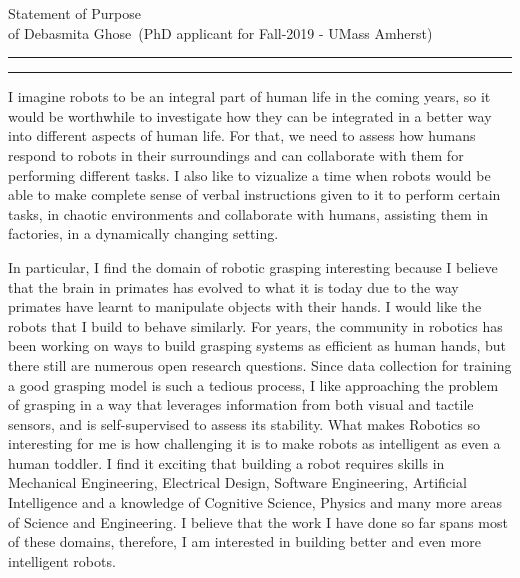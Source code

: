 \documentclass[11pt]{article}
\newcommand{\soptitle}{Statement of Purpose}
\newcommand{\yourname}{Debasmita Ghose}
\begin{document}
\begin{center}\LARGE\soptitle\\
\large of \yourname\ (PhD applicant for Fall-2019 - UMass Amherst)
\end{center}

\hrule
\vspace{0pt}
\hrule height 1pt

\justify

I imagine robots to be an integral part of human life in the coming years, so it would be worthwhile to investigate how they can be integrated in a better way into different aspects of human life. For that, we need to assess how humans respond to robots in their surroundings and can collaborate with them for performing different tasks. I also like to vizualize a time when robots would be able to make complete sense of verbal instructions given to it to perform certain tasks, in chaotic environments and collaborate with humans, assisting them in factories, in a dynamically changing setting.
\par
\justify
  In particular, I find the domain of robotic grasping interesting because I believe that the brain in primates has evolved to what it is today due to the way primates have learnt to manipulate objects with their hands. I would like the robots that I build to behave similarly. For years, the community in robotics has been working on ways to build grasping systems as efficient as  human hands, but there still are numerous open research questions. Since data collection for training a good grasping model is such a tedious process,  I like approaching the problem of grasping in a way that leverages information from both visual and tactile sensors, and is self-supervised to assess its stability. What makes Robotics so interesting for me is how challenging it is to make robots as intelligent as even a human toddler. I find it exciting that building a robot requires skills in Mechanical Engineering, Electrical Design, Software Engineering, Artificial Intelligence and a knowledge of Cognitive Science, Physics and many more areas of Science and Engineering. I believe that the work I have done so far spans most of these domains, therefore, I am interested in building better and even more intelligent robots.    
\par
\justify
\end{document}
